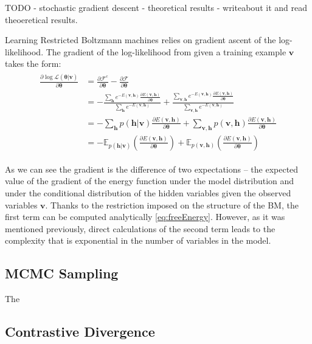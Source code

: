 \documentclass[../report/report.tex]{subfiles}
\begin{document}
TODO - stochastic gradient descent - theoretical results - writeabout it and read theoeretical results.

Learning Restricted Boltzmann machines relies on  gradient ascent of the log-likelihood. The gradient of the log-likelihood from given a training example $\mathbf{v}$ takes the form:
\begin{align}
\begin{split}
\frac{\partial \log \mathcal{L}(\mathbf{\theta  | \mathbf{v}})}{\partial \mathbf{\theta}} & = \frac{\partial \mathcal{F}^c }{\partial \mathbf{\theta}} - \frac{\partial \mathcal{F} }{\partial \mathbf{\theta}} \\
& = - \frac{\sum_{\mathbf{h}} e^{-E(\mathbf{v,h})} \frac{\partial E(\mathbf{v,h})}{\partial \mathbf{\theta}}}{\sum_{\mathbf{h}} e^{-E(\mathbf{v,h})}} + \frac{\sum_{\mathbf{v, h}} e^{-E(\mathbf{v,h})} \frac{\partial E(\mathbf{v,h})}{\partial \mathbf{\theta}}}{\sum_{\mathbf{v, h}} e^{-E(\mathbf{v,h})}} \\
& = - \sum_\mathbf{h} p(\mathbf{h} | \mathbf{v}) \frac{\partial E(\mathbf{v,h})}{\partial \mathbf{\theta}} +  \sum_\mathbf{v, h} p(\mathbf{v}, \mathbf{h}) \frac{\partial E(\mathbf{v,h})}{\partial \mathbf{\theta}} \\
& =  - \mathbb{E}_{p(\mathbf{h} | \mathbf{v})} \left( \frac{\partial E(\mathbf{v,h})}{\partial \mathbf{\theta}} \right) + \mathbb{E}_{ p(\mathbf{v,h}) } \left( \frac{\partial E(\mathbf{v,h})}{\partial \mathbf{\theta}} \right)
\end{split}
\end{align}

As we can see the gradient is the difference of two expectations -- the expected value of the gradient of the energy function under the model distribution and under the conditional distribution of the hidden variables given the observed variables $\mathbf{v}$. Thanks to the restriction imposed on the structure of the BM, the first term can be computed analytically \ref{eq:freeEnergy}. However, as it was mentioned previously, direct calculations of the second term leads to the complexity that is exponential in the number of variables in the model.

\subsection{MCMC Sampling}
The 
    
 \subsection{Contrastive Divergence}
\end{document}

